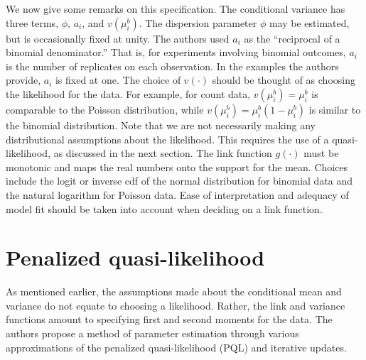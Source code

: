 \documentclass[12pt]{article}
\begin{document}
We now give some remarks on this specification. The conditional variance has three terms, $\phi$, $a_i$, and $v(\mu_i^b)$. The dispersion parameter $\phi$ may be estimated, but is occasionally fixed at unity. The authors used $a_i$ as the ``reciprocal of a binomial denominator.'' That is, for experiments involving binomial outcomes, $a_i$ is the number of replicates on each observation. In the examples the authors provide, $a_i$ is fixed at one. The choice of $v(\cdot)$ should be thought of as choosing the likelihood for the data. For example, for count data, $v(\mu_i^b)=\mu_i^b$ is comparable to the Poisson distribution, while $v(\mu_i^b)=\mu_i^b(1-\mu_i^b)$ is similar to the binomial distribution. Note that we are not necessarily making any distributional assumptions about the likelihood. This requires the use of a quasi-likelihood, as discussed in the next section. The link function $g(\cdot)$ must be monotonic and maps the real numbers onto the support for the mean. Choices include the logit or inverse cdf of the normal distribution for binomial data and the natural logarithm for Poisson data. Ease of interpretation and adequacy of model fit should be taken into account when deciding on a link function.

\section{Penalized quasi-likelihood}

\noindent As mentioned earlier, the assumptions made about the conditional mean and variance do not equate to choosing a likelihood. Rather, the link and variance functions amount to specifying first and second moments for the data. The authors propose a method of parameter estimation through various approximations of the penalized quasi-likelihood (PQL) and iterative updates.
\end{document}
